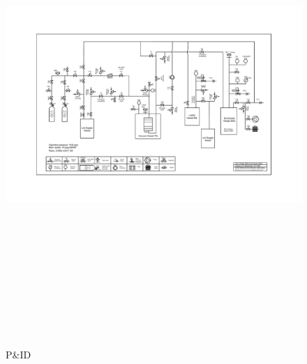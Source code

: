 \documentclass[letterpaper,11pt]{article}
\begin{document}
\clearpage
\begin{figure}[htb]
\begin{center}
\includegraphics[angle=90,origin=c,height=7.2in]{fig/PIDv8.3.pdf}
\caption{P\&ID}
\end{center}
\end{figure}
\clearpage
\end{document}
